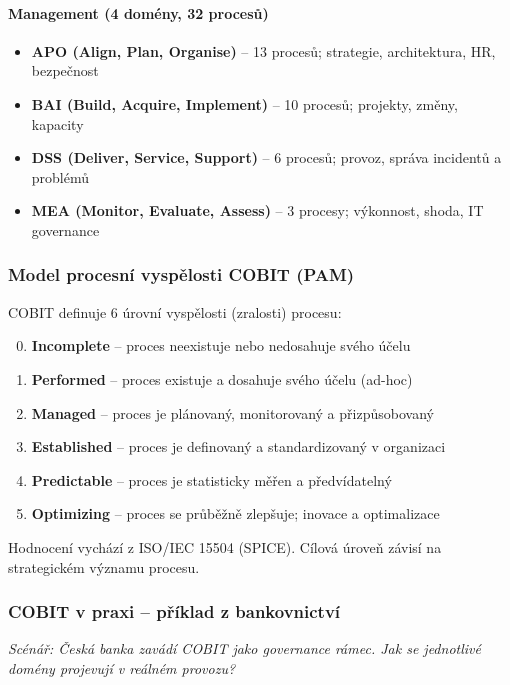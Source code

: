 \paragraph{Management (4 domény, 32 procesů)}
\begin{itemize}
  \item \textbf{APO (Align, Plan, Organise)} -- 13 procesů; strategie, architektura, HR, bezpečnost
  \item \textbf{BAI (Build, Acquire, Implement)} -- 10 procesů; projekty, změny, kapacity
  \item \textbf{DSS (Deliver, Service, Support)} -- 6 procesů; provoz, správa incidentů a problémů
  \item \textbf{MEA (Monitor, Evaluate, Assess)} -- 3 procesy; výkonnost, shoda, IT governance
\end{itemize}

\subsubsection{Model procesní vyspělosti COBIT (PAM)}

COBIT definuje 6 úrovní vyspělosti (zralosti) procesu:
\begin{enumerate}
  \setcounter{enumi}{-1}
  \item \textbf{Incomplete} -- proces neexistuje nebo nedosahuje svého účelu
  \item \textbf{Performed} -- proces existuje a dosahuje svého účelu (ad-hoc)
  \item \textbf{Managed} -- proces je plánovaný, monitorovaný a přizpůsobovaný
  \item \textbf{Established} -- proces je definovaný a standardizovaný v organizaci
  \item \textbf{Predictable} -- proces je statisticky měřen a předvídatelný
  \item \textbf{Optimizing} -- proces se průběžně zlepšuje; inovace a optimalizace
\end{enumerate}

Hodnocení vychází z ISO/IEC 15504 (SPICE). Cílová úroveň závisí na strategickém významu procesu.

\subsubsection{COBIT v praxi -- příklad z bankovnictví}

\textit{Scénář: Česká banka zavádí COBIT jako governance rámec. Jak se jednotlivé domény projevují v reálném provozu?}

